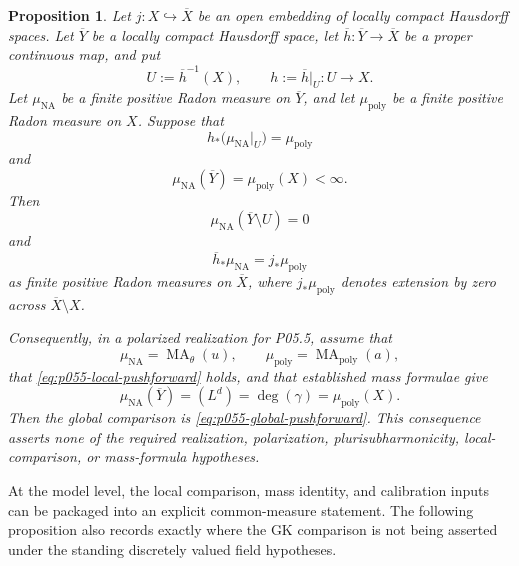 \documentclass[11pt,a4paper]{article}
\newtheorem{proposition}[proposition]{Proposition}
\theoremstyle{definition}
\theoremstyle{remark}
\DeclareMathOperator{\MA}{MA}
\begin{document}
\begin{proposition}
\label{prop:p055-boundary-mass-completion}
Let \(j:X\hookrightarrow\overline X\) be an open embedding of locally compact
Hausdorff spaces.  Let \(\overline Y\) be a locally compact Hausdorff space,
let \(\overline h:\overline Y\to\overline X\) be a proper continuous map, and
put
\[
 U:=\overline h^{-1}(X),\qquad h:=\overline h|_U:U\longrightarrow X.
\]
Let \(\mu_{\mathrm{NA}}\) be a finite positive Radon measure on
\(\overline Y\), and let \(\mu_{\mathrm{poly}}\) be a finite positive Radon
measure on \(X\).  Suppose that
\begin{equation}
 h_*\bigl(\mu_{\mathrm{NA}}|_U\bigr)=\mu_{\mathrm{poly}}
 \label{eq:p055-local-pushforward}
\end{equation}
and
\begin{equation}
 \mu_{\mathrm{NA}}(\overline Y)
 =\mu_{\mathrm{poly}}(X)<\infty.
 \label{eq:p055-equal-mass}
\end{equation}
Then
\begin{equation}
 \mu_{\mathrm{NA}}(\overline Y\setminus U)=0
 \label{eq:p055-zero-source-boundary}
\end{equation}
and
\begin{equation}
 \overline h_*\mu_{\mathrm{NA}}=j_*\mu_{\mathrm{poly}}
 \label{eq:p055-global-pushforward}
\end{equation}
as finite positive Radon measures on \(\overline X\), where
\(j_*\mu_{\mathrm{poly}}\) denotes extension by zero across
\(\overline X\setminus X\).

Consequently, in a polarized realization for P05.5, assume that
\[
 \mu_{\mathrm{NA}}=\MA_\theta(u),\qquad
 \mu_{\mathrm{poly}}=\MA_{\mathrm{poly}}(a),
\]
that \eqref{eq:p055-local-pushforward} holds, and that established mass
formulae give
\[
 \mu_{\mathrm{NA}}(\overline Y)=(L^d)
 =\deg(\gamma)=\mu_{\mathrm{poly}}(X).
\]
Then the global comparison is \eqref{eq:p055-global-pushforward}.  This
consequence asserts none of the required realization, polarization,
plurisubharmonicity, local-comparison, or mass-formula hypotheses.
\end{proposition}




At the model level, the local comparison, mass identity, and calibration
inputs can be packaged into an explicit common-measure statement.  The
following proposition also records exactly where the GK comparison is not
being asserted under the standing discretely valued field hypotheses.
\end{document}
